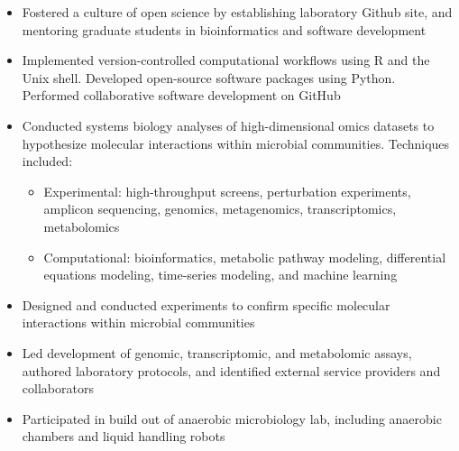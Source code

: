 \documentclass[letterpaper,10pt]{article}
\begin{document}
\begin{itemize}
\begin{itemize}
			\item Fostered a culture of open science by establishing laboratory Github site, and mentoring graduate students in bioinformatics and software development
			\item Implemented version-controlled computational workflows using R and the Unix shell. Developed open-source software packages using Python. Performed collaborative software development on GitHub
			\item Conducted systems biology analyses of high-dimensional omics datasets to hypothesize molecular interactions within microbial communities. Techniques included:
				\begin{itemize}
					\item Experimental: high-throughput screens, perturbation experiments, amplicon sequencing, genomics, metagenomics, transcriptomics, metabolomics
					\item Computational: bioinformatics, metabolic pathway modeling, differential equations modeling, time-series modeling, and machine learning
				\end{itemize}
			\item Designed and conducted experiments to confirm specific molecular interactions within microbial communities
			\item Led development of genomic, transcriptomic, and metabolomic assays, authored laboratory protocols, and identified external service providers and collaborators
			\item Participated in build out of anaerobic microbiology lab, including anaerobic chambers and liquid handling robots

\end{itemize}
\end{itemize}
\end{document}
